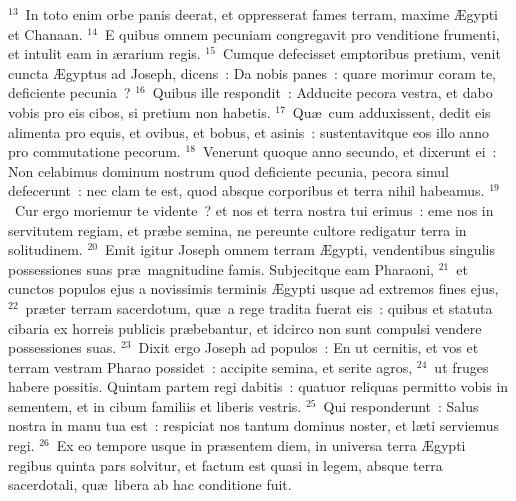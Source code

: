 ${}^{13}$~In toto enim orbe panis deerat, et oppresserat fames terram, maxime \AE gypti et Chanaan.
${}^{14}$~E quibus omnem pecuniam congregavit pro venditione frumenti, et intulit eam in \ae rarium regis.
${}^{15}$~Cumque defecisset emptoribus pretium, venit cuncta \AE gyptus ad Joseph, dicens~: Da nobis panes~: quare morimur coram te, deficiente pecunia~?
${}^{16}$~Quibus ille respondit~: Adducite pecora vestra, et dabo vobis pro eis cibos, si pretium non habetis.
${}^{17}$~Qu\ae\ cum adduxissent, dedit eis alimenta pro equis, et ovibus, et bobus, et asinis~: sustentavitque eos illo anno pro commutatione pecorum.
${}^{18}$~Venerunt quoque anno secundo, et dixerunt ei~: Non celabimus dominum nostrum quod deficiente pecunia, pecora simul defecerunt~: nec clam te est, quod absque corporibus et terra nihil habeamus.
${}^{19}$~Cur ergo moriemur te vidente~? et nos et terra nostra tui erimus~: eme nos in servitutem regiam, et pr\ae be semina, ne pereunte cultore redigatur terra in solitudinem.
${}^{20}$~Emit igitur Joseph omnem terram \AE gypti, vendentibus singulis possessiones suas pr\ae\ magnitudine famis. Subjecitque eam Pharaoni,
${}^{21}$~et cunctos populos ejus a novissimis terminis \AE gypti usque ad extremos fines ejus,
${}^{22}$~pr\ae ter terram sacerdotum, qu\ae\ a rege tradita fuerat eis~: quibus et statuta cibaria ex horreis publicis pr\ae bebantur, et idcirco non sunt compulsi vendere possessiones suas.
${}^{23}$~Dixit ergo Joseph ad populos~: En ut cernitis, et vos et terram vestram Pharao possidet~: accipite semina, et serite agros,
${}^{24}$~ut fruges habere possitis. Quintam partem regi dabitis~: quatuor reliquas permitto vobis in sementem, et in cibum familiis et liberis vestris.
${}^{25}$~Qui responderunt~: Salus nostra in manu tua est~: respiciat nos tantum dominus noster, et l\ae ti serviemus regi.
${}^{26}$~Ex eo tempore usque in pr\ae sentem diem, in universa terra \AE gypti regibus quinta pars solvitur, et factum est quasi in legem, absque terra sacerdotali, qu\ae\ libera ab hac conditione fuit.


